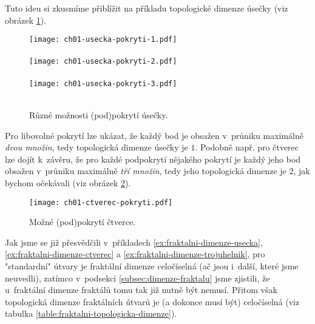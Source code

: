 
Tuto ideu si zkusmíme přiblížit na příkladu topologické dimenze úsečky (viz obrázek \ref{fig:usecka-zjemneni}).
\begin{figure}[h]
    \centering
    \texttt{[image: ch01-usecka-pokryti-1.pdf]}\\\qquad\\
    \texttt{[image: ch01-usecka-pokryti-2.pdf]}\\\qquad\\
    \texttt{[image: ch01-usecka-pokryti-3.pdf]}\\\qquad\\
    \caption{Různé možnosti (pod)pokrytí úsečky.}
    \label{fig:usecka-zjemneni}
\end{figure}
Pro libovolné pokrytí lze ukázat, že každý bod je obsažen v~průniku maximálně \emph{dvou množin}, tedy topologická dimenze úsečky je $1$. Podobně např. pro čtverec lze dojít k~závěru, že pro každé podpokrytí nějakého pokrytí je každý jeho bod obsažen v~průniku maximálně \emph{tří množin}, tedy jeho topologická dimenze je 2, jak bychom očekávali (viz obrázek \ref{fig:ctverec-zjemneni}).
\begin{figure}[h]
    \centering
    \texttt{[image: ch01-ctverec-pokryti.pdf]}
    \caption{Možné (pod)pokrytí čtverce.}
    \label{fig:ctverec-zjemneni}
\end{figure}
Jak jsme se již přesvědčili v~příkladech \ref{ex:fraktalni-dimenze-usecka}, \ref{ex:fraktalni-dimenze-ctverec} a \ref{ex:fraktalni-dimenze-trojuhelnik}, pro "standardní" útvary je fraktální dimenze celočíselná (ač jsou i~další, které jsme neuvedli), zatímco v~podsekci \ref{subsec:dimenze-fraktalu} jsme zjistili, že u~fraktální dimenze fraktálů tomu tak již nutně být nemusí. Přitom však topologická dimenze fraktálních útvarů je (a dokonce musí být) celočíselná (viz tabulka \ref{table:fraktalni-topologicka-dimenze}).
